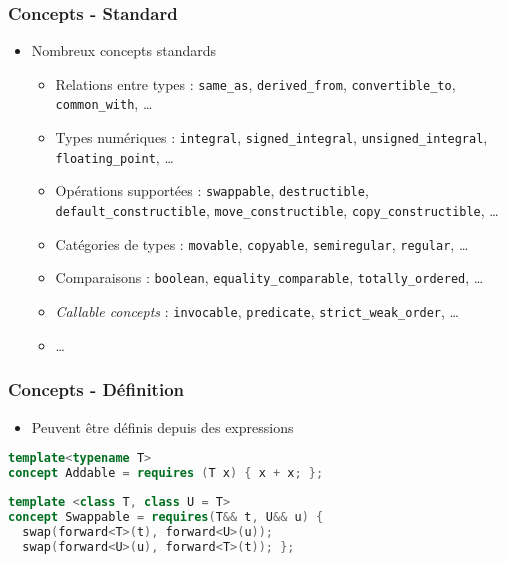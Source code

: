 \documentclass[C++.tex]{subfiles}
\begin{document}
\begin{frame}[fragile]
	\frametitle{Concepts - Standard}
	\begin{itemize}
		\item Nombreux concepts standards
		\begin{itemize}
			\item Relations entre types : \lstinline|same_as|, \lstinline|derived_from|, \lstinline|convertible_to|, \lstinline|common_with|, \ldots
			\item Types numériques : \lstinline|integral|, \lstinline|signed_integral|, \lstinline|unsigned_integral|, \lstinline|floating_point|, \ldots
			\item Opérations supportées : \lstinline|swappable|, \lstinline|destructible|, \lstinline|default_constructible|, \lstinline|move_constructible|, \lstinline|copy_constructible|, \ldots
			\item Catégories de types : \lstinline|movable|, \lstinline|copyable|, \lstinline|semiregular|, \lstinline|regular|, \ldots


			\item Comparaisons : \lstinline|boolean|, \lstinline|equality_comparable|, \lstinline|totally_ordered|, \ldots
			\item \textit{Callable concepts} : \lstinline|invocable|, \lstinline|predicate|, \lstinline|strict_weak_order|, \ldots


			\item \ldots
		\end{itemize}
	\end{itemize}
\end{frame}

\begin{frame}[fragile]
	\frametitle{Concepts - Définition}
	\begin{itemize}
		\item Peuvent être définis depuis des expressions
	\end{itemize}

	\begin{lstlisting}[language=C++]
template<typename T>
concept Addable = requires (T x) { x + x; };\end{lstlisting}

	\begin{lstlisting}[language=C++]
template <class T, class U = T>
concept Swappable = requires(T&& t, U&& u) {
  swap(forward<T>(t), forward<U>(u));
  swap(forward<U>(u), forward<T>(t)); };\end{lstlisting}
\end{frame}
\end{document}
